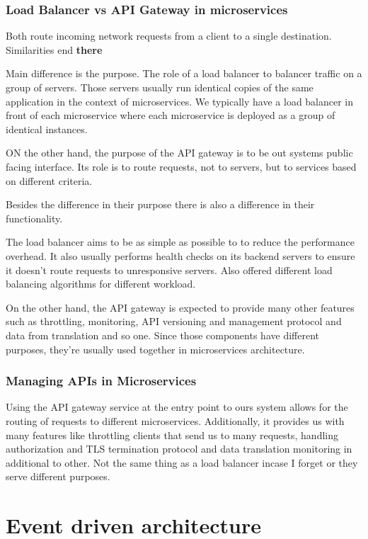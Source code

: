 \subsubsection{Load Balancer vs API Gateway in microservices}

Both route incoming network requests from a client to a single destination.
Similarities end \textbf{there}

Main difference is the purpose.
The role of a load balancer to balancer traffic on a group of servers.
Those servers usually run identical copies of the same application in the context of microservices.
We typically have a load balancer in front of each microservice where each microservice is deployed as a group of identical instances.

ON the other hand, the purpose of the API gateway is to be out systems public facing interface.
Its role is to route requests, not to servers, but to services based on different criteria.

Besides the difference in their purpose there is also a difference in their functionality.

The load balancer aims to be as simple as possible to to reduce the performance overhead.
It also usually performs health checks on its backend servers to ensure it doesn't route requests to unresponsive servers.
Also offered different load balancing algorithms for different workload.

On the other hand, the API gateway is expected to provide many other features such as throttling, monitoring, API versioning and management protocol and data from translation and so one.
Since those components have different purposes, they're usually used together in microservices architecture.

\subsubsection{Managing APIs in Microservices}
Using the API gateway service at the entry point to ours system allows for the routing of requests to different microservices.
Additionally, it provides us with many features like throttling clients that send us to many requests, handling authorization and TLS termination protocol and data translation monitoring in additional to other.
Not the same thing as a load balancer incase I forget or they serve different purposes.


\section{Event driven architecture}

